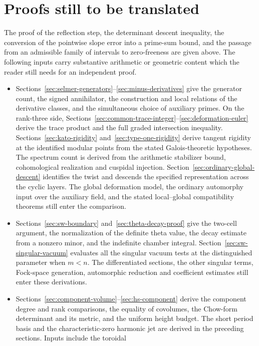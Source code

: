 \documentclass[10pt]{article}
\begin{document}
\section*{Proofs still to be translated}
The proof of the reflection step, the determinant descent inequality,
the conversion of the pointwise slope error into a prime-sum bound, and
the passage from an admissible family of intervals to zero-freeness
are given above. The following inputs carry substantive arithmetic or
geometric content which the reader still needs for an independent proof.
\begin{itemize}
\item Sections~\ref{sec:selmer-generators}--\ref{sec:minus-derivatives}
give the generator count, the signed annihilator, the construction and
local relations of the derivative classes, and the simultaneous choice
of auxiliary primes. On the rank-three side,
Sections~\ref{sec:common-trace-integer}--\ref{sec:deformation-euler}
derive the trace product and the full graded intersection inequality.
Sections~\ref{sec:kato-rigidity} and~\ref{sec:type-one-rigidity} derive
tangent rigidity at the identified modular points from the stated
Galois-theoretic hypotheses. The spectrum count is derived from the arithmetic stabilizer bound,
cohomological realization and cuspidal injection. Section~\ref{sec:ordinary-global-descent} identifies the twist and descends
the specified representation across the cyclic layers. The global deformation
model, the ordinary automorphy input over the auxiliary field, and the stated
local--global compatibility theorems still enter the comparison.
\item Sections~\ref{sec:sw-boundary} and~\ref{sec:theta-decay-proof}
give the two-cell argument, the normalization of the definite theta
value, the decay estimate from a nonzero minor, and the indefinite
chamber integral. Section~\ref{sec:sw-singular-vacuum} evaluates all the singular
vacuum tests at the distinguished parameter when \(m<n\). The differentiated
sections, the other singular terms, Fock-space generation, automorphic reduction and coefficient estimates
still enter these derivations.
\item Sections~\ref{sec:component-volume}--\ref{sec:hs-component}
derive the component degree and rank comparisons, the equality of
covolumes, the Chow-form determinant and its metric, and the uniform
height budget. The short period basis and the characteristic-zero harmonic
jet are derived in the preceding sections. Inputs include the toroidal

\end{itemize}
\end{document}
